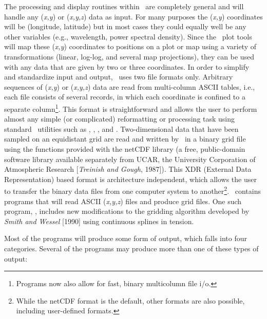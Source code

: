 The processing and display routines within \GMT\ are completely general
and will handle any (\emph{x,y}) or (\emph{x,y,z}) data as input.
For many purposes the (\emph{x,y}) coordinates will be (longitude,
latitude) but in most cases they could equally well be any other
variables (e.g., wavelength, power spectral density).  Since the \GMT\
plot tools will map these (\emph{x,y}) coordinates to positions on a
plot or map using a variety of transformations (linear, log-log, and
several map projections), they can be used with any data that are
given by two or three coordinates.  In order to simplify and standardize
input and output, \GMT\ uses two file formats only.  Arbitrary sequences
of (\emph{x,y}) or (\emph{x,y,z}) data are read from multi-column ASCII
tables, i.e., each file consists of several records, in which each
coordinate is confined to a separate column\footnote{Programs now also
allow for fast, binary multicolumn file i/o.}.  This format is
straightforward and allows the user to perform almost any simple
(or complicated) reformatting or processing task using standard
\UNIX\ utilities such as , , ,
\progname{sed} and \progname{awk}.
Two-dimensional data that have been sampled on an equidistant grid are
read and written by \GMT\ in a binary grid file using the functions
provided with the netCDF\index{netCDF} library (a free, public-domain software
library available separately from UCAR, the University Corporation
of Atmospheric Research [\emph{Treinish and Gough}, 1987]).  This XDR
(External Data Representation) based format is architecture independent,
which allows the user to transfer the binary data files from one
computer system to another\footnote{While the netCDF format is the default,
other formats are also possible, including user-defined formats.}.
\GMT\ contains programs that will read ASCII
(\emph{x,y,z}) files and produce grid files.  One such program,
, includes new modifications to the gridding algorithm
developed by \emph{Smith and Wessel} [1990] using continuous splines
in tension. 

Most of the programs will produce some form of output, which falls
into four categories.  Several of the programs may produce more than
one of these types of output:\par 

